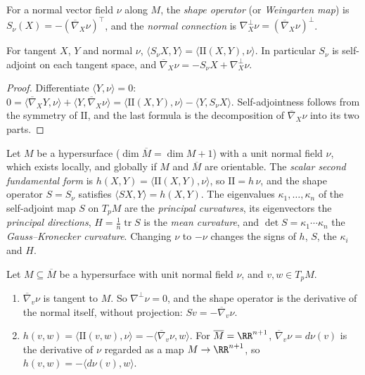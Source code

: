 \begin{definition}\label{riemannian-geometry:definition-shape-operator}
For a normal vector field $\nu$ along $M$, the \emph{shape operator} (or \emph{Weingarten map}) is $S_\nu(X) = -(\overline{\nabla}_X\nu)^\top$, and the \emph{normal
connection} is $\nabla^\perp_X\nu = (\overline{\nabla}_X\nu)^\perp$.
\end{definition}

\begin{proposition}\label{riemannian-geometry:proposition-weingarten}
For tangent $X$, $Y$ and normal $\nu$, $\langle S_\nu X, Y\rangle = \langle\mathrm{II}(X, Y), \nu\rangle$. In particular $S_\nu$ is self-adjoint on each tangent space, and
$\overline{\nabla}_X\nu = -S_\nu X + \nabla^\perp_X\nu$.
\end{proposition}

\begin{proof}
Differentiate $\langle Y, \nu\rangle = 0$: $0 = \langle\overline{\nabla}_XY, \nu\rangle + \langle Y, \overline{\nabla}_X\nu\rangle = \langle\mathrm{II}(X, Y), \nu\rangle - \langle Y, S_\nu X\rangle$. Self-adjointness
follows from the symmetry of $\mathrm{II}$, and the last formula is the decomposition of $\overline{\nabla}_X\nu$ into its two parts.
\end{proof}

\begin{definition}\label{riemannian-geometry:definition-hypersurface-curvatures}
Let $M$ be a hypersurface ($\dim\overline{M} = \dim M + 1$) with a unit normal field $\nu$, which exists locally, and globally if $M$ and $\overline{M}$ are orientable.
The \emph{scalar second fundamental form} is $h(X, Y) = \langle\mathrm{II}(X, Y), \nu\rangle$, so $\mathrm{II} = h\,\nu$, and the shape operator $S = S_\nu$ satisfies
$\langle SX, Y\rangle = h(X, Y)$. The eigenvalues $\kappa_1, \ldots, \kappa_n$ of the self-adjoint map $S$ on $T_pM$ are the \emph{principal curvatures}, its eigenvectors the
\emph{principal directions}, $H = \frac1n\operatorname{tr}S$ is the \emph{mean curvature}, and $\det S = \kappa_1 \cdots \kappa_n$ the \emph{Gauss--Kronecker
curvature}. Changing $\nu$ to $-\nu$ changes the signs of $h$, $S$, the $\kappa_i$ and $H$.
\end{definition}

\begin{proposition}\label{riemannian-geometry:proposition-normal-derivative}
Let $M \subseteq \overline{M}$ be a hypersurface with unit normal field $\nu$, and $v, w \in T_pM$.
\begin{enumerate}
\item $\overline{\nabla}_v\nu$ is tangent to $M$. So $\nabla^\perp\nu = 0$, and the shape operator is the derivative of the normal itself, without projection: $S v = -\overline{\nabla}_v\nu$.
\item $h(v, w) = \langle\mathrm{II}(v, w), \nu\rangle = -\langle\overline{\nabla}_v\nu, w\rangle$. For $\overline{M} = \RR^{n+1}$, $\overline{\nabla}_v\nu = d\nu(v)$ is the derivative of $\nu$ regarded as a map $M \to \RR^{n+1}$, so
$h(v, w) = -\langle d\nu(v), w\rangle$.
\end{enumerate}
\end{proposition}

